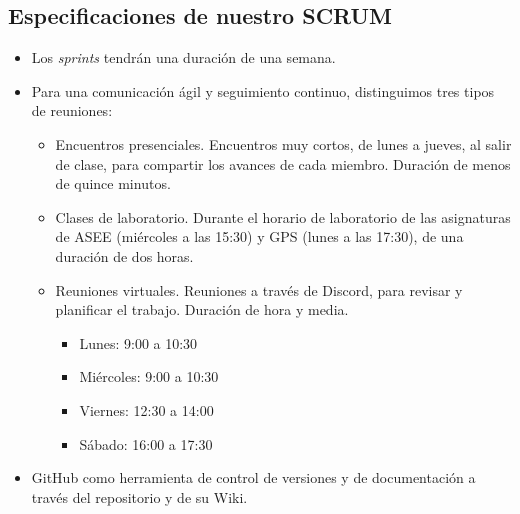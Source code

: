 \documentclass[../main.tex]{subfiles}
\begin{document}
\subsection{Especificaciones de nuestro SCRUM}

\begin{itemize}
    \item Los \textit{sprints} tendrán una duración de una semana.
    \item Para una comunicación ágil y seguimiento continuo, distinguimos tres tipos de reuniones:
    \begin{itemize}
        \item Encuentros presenciales. Encuentros muy cortos, de lunes a jueves, al salir de clase, para compartir los avances de cada miembro. Duración de menos de quince minutos.
        \item Clases de laboratorio. Durante el horario de laboratorio de las asignaturas de ASEE (miércoles a las 15:30) y GPS (lunes a las 17:30), de una duración de dos horas.
        \item Reuniones virtuales. Reuniones a través de Discord, para revisar y planificar el trabajo. Duración de hora y media.
        \begin{itemize}
            \item Lunes: 9:00 a 10:30
            \item Miércoles: 9:00 a 10:30
            \item Viernes: 12:30 a 14:00
            \item Sábado: 16:00 a 17:30
        \end{itemize}
    \end{itemize}
    \item GitHub como herramienta de control de versiones y de documentación a través del repositorio y de su Wiki.
\end{itemize}
\end{document}
